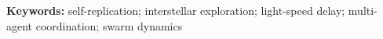 \documentclass[11pt]{article}
\begin{document}
\noindent\textbf{Keywords:} self-replication; interstellar exploration; light-speed delay;
multi-agent coordination; swarm dynamics

\bigskip








\end{document}
